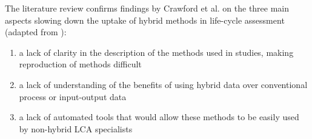 \documentclass{article}
\begin{document}
        The literature review confirms findings by Crawford et al. on the three main aspects slowing down the uptake of hybrid methods in life-cycle assessment (adapted from \cite{crawford_hybrid_2018}):
        
        \begin{enumerate}[nosep]
            \item a lack of clarity in the description of the methods used in studies, making reproduction of methods difficult
            \item a lack of understanding of the benefits of using hybrid data over conventional process or input-output data
            \item a lack of automated tools that would allow these methods to be easily used by non-hybrid LCA specialists
        \end{enumerate}
\end{document}
